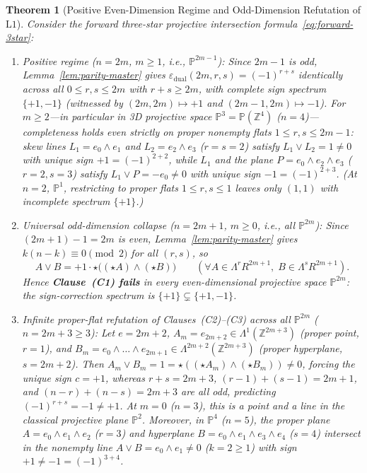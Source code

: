 \documentclass[11pt]{article}
\newtheorem{theorem}{Theorem}[section]
\theoremstyle{definition}
\newcommand{\Proj}{\mathbb{P}}
\newcommand{\Z}{\mathbb{Z}}
\begin{document}
\begin{theorem}[Positive Even-Dimension Regime and Odd-Dimension Refutation of $\mathrm{L1}$]\label{thm:L1-dichotomy}
Consider the forward three-star projective intersection formula~\eqref{eq:forward-3star}:
\begin{enumerate}
\item \emph{Positive regime ($n = 2m$, $m \ge 1$, i.e., $\Proj^{2m-1}$):} Since $2m - 1$ is odd, Lemma~\ref{lem:parity-master} gives $\varepsilon_{\mathrm{dual}}(2m, r, s) = (-1)^{r+s}$ identically across all $0 \le r, s \le 2m$ with $r + s \ge 2m$, with complete sign spectrum $\{+1, -1\}$ (witnessed by $(2m, 2m) \mapsto +1$ and $(2m-1, 2m) \mapsto -1$). For $m \ge 2$---in particular in 3D projective space $\Proj^3 = \Proj(\Z^4)$ ($n = 4$)---completeness holds even strictly on proper nonempty flats $1 \le r, s \le 2m - 1$: skew lines $L_1 = e_0 \wedge e_1$ and $L_2 = e_2 \wedge e_3$ ($r = s = 2$) satisfy $L_1 \vee L_2 = 1 \neq 0$ with unique sign $+1 = (-1)^{2+2}$, while $L_1$ and the plane $P = e_0 \wedge e_2 \wedge e_3$ ($r = 2, s = 3$) satisfy $L_1 \vee P = -e_0 \neq 0$ with unique sign $-1 = (-1)^{2+3}$. (At $n = 2$, $\Proj^1$, restricting to proper flats $1 \le r, s \le 1$ leaves only $(1,1)$ with incomplete spectrum $\{+1\}$.)
\item \emph{Universal odd-dimension collapse ($n = 2m + 1$, $m \ge 0$, i.e., all $\Proj^{2m}$):} Since $(2m + 1) - 1 = 2m$ is even, Lemma~\ref{lem:parity-master} gives $k(n - k) \equiv 0 \pmod{2}$ for \emph{all} $(r, s)$, so
\[
A \vee B = +1 \cdot \star\bigl((\star A) \wedge (\star B)\bigr) \qquad (\forall A \in \Lambda^r R^{2m+1},\; B \in \Lambda^s R^{2m+1}).
\]
Hence \textbf{Clause~(C1) fails} in every even-dimensional projective space $\Proj^{2m}$: the sign-correction spectrum is $\{+1\} \subsetneq \{+1, -1\}$.
\item \emph{Infinite proper-flat refutation of Clauses~(C2)--(C3) across all $\Proj^{2m}$ ($n = 2m + 3 \ge 3$):} Let $e = 2m + 2$, $A_m = e_{2m+2} \in \Lambda^1(\Z^{2m+3})$ (proper point, $r = 1$), and $B_m = e_0 \wedge \dots \wedge e_{2m+1} \in \Lambda^{2m+2}(\Z^{2m+3})$ (proper hyperplane, $s = 2m + 2$). Then $A_m \vee B_m = 1 = \star((\star A_m) \wedge (\star B_m)) \neq 0$, forcing the unique sign $c = +1$, whereas $r + s = 2m + 3$, $(r-1)+(s-1) = 2m + 1$, and $(n-r)+(n-s) = 2m + 3$ are all odd, predicting $(-1)^{r+s} = -1 \neq +1$. At $m = 0$ ($n = 3$), this is a point and a line in the classical projective plane $\Proj^2$. Moreover, in $\Proj^4$ ($n = 5$), the proper plane $A = e_0 \wedge e_1 \wedge e_2$ ($r = 3$) and hyperplane $B = e_0 \wedge e_1 \wedge e_3 \wedge e_4$ ($s = 4$) intersect in the nonempty line $A \vee B = e_0 \wedge e_1 \neq 0$ ($k = 2 \ge 1$) with sign $+1 \neq -1 = (-1)^{3+4}$.

\end{enumerate}
\end{theorem}
\end{document}
